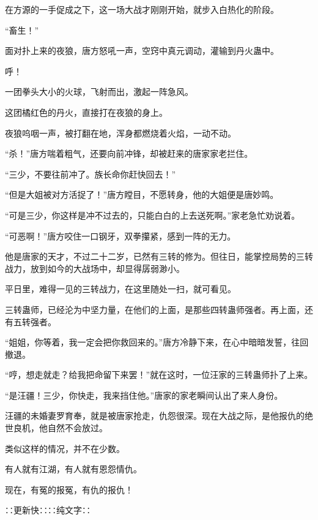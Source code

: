 \begin{this_body}
在方源的一手促成之下，这一场大战才刚刚开始，就步入白热化的阶段。

“畜生！”

面对扑上来的夜狼，唐方怒吼一声，空窍中真元调动，灌输到丹火蛊中。

呼！

一团拳头大小的火球，飞射而出，激起一阵急风。

这团橘红色的丹火，直接打在夜狼的身上。

夜狼呜咽一声，被打翻在地，浑身都燃烧着火焰，一动不动。

“杀！”唐方喘着粗气，还要向前冲锋，却被赶来的唐家家老拦住。

“三少，不要往前冲了。族长命你赶快回去！”

“但是大姐被对方活捉了！”唐方瞠目，不愿转身，他的大姐便是唐妙鸣。

“可是三少，你这样是冲不过去的，只能白白的上去送死啊。”家老急忙劝说着。

“可恶啊！”唐方咬住一口钢牙，双拳攥紧，感到一阵的无力。

他是唐家的天才，不过二十二岁，已然有三转的修为。但往日，能掌控局势的三转战力，放到如今的大战场中，却显得孱弱渺小。

平日里，难得一见的三转战力，在这里随处一扫，就可看见。

三转蛊师，已经沦为中坚力量，在他们的上面，是那些四转蛊师强者。再上面，还有五转强者。

“姐姐，你等着，我一定会把你救回来的。”唐方冷静下来，在心中暗暗发誓，往回撤退。

“哼，想走就走？给我把命留下来罢！”就在这时，一位汪家的三转蛊师扑了上来。

“是汪疆！三少，你快走，我来挡住他。”唐家的家老瞬间认出了来人身份。

汪疆的未婚妻罗育奉，就是被唐家抢走，仇怨很深。现在大战之际，是他报仇的绝世良机，他自然不会放过。

类似这样的情况，并不在少数。

有人就有江湖，有人就有恩怨情仇。

现在，有冤的报冤，有仇的报仇！

∷更新快∷∷纯文字∷

\end{this_body}

